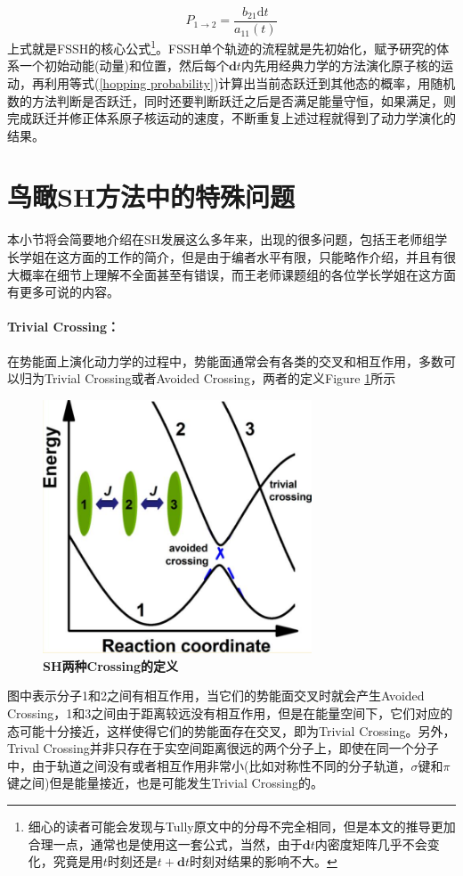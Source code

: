 \documentclass[12pt,a4paper,openany,twoside]{book}
\numberwithin{equation}{section}
\begin{document}
        \begin{equation}
          P_{1\rightarrow2}=\frac{b_{21} \mathrm{d}t }{ a_{11}(t)}
          \label{hopping probability}
        \end{equation}
        上式就是FSSH的核心公式\footnote{细心的读者可能会发现与Tully原文中的分母不完全相同，但是本文的推导更加合理一点，通常也是使用这一套公式，当然，由于$\mathbf{d}t$内密度矩阵几乎不会变化，究竟是用$t$时刻还是$t+\mathbf{d}t$时刻对结果的影响不大。}。FSSH单个轨迹的流程就是先初始化，赋予研究的体系一个初始动能(动量)和位置，然后每个$\mathbf{d}t$内先用经典力学的方法演化原子核的运动，再利用等式(\ref{hopping probability})计算出当前态跃迁到其他态的概率，用随机数的方法判断是否跃迁，同时还要判断跃迁之后是否满足能量守恒，如果满足，则完成跃迁并修正体系原子核运动的速度，不断重复上述过程就得到了动力学演化的结果。
        
      \section{鸟瞰SH方法中的特殊问题}
        本小节将会简要地介绍在SH发展这么多年来，出现的很多问题，包括王老师组学长学姐在这方面的工作的简介，但是由于编者水平有限，只能略作介绍，并且有很大概率在细节上理解不全面甚至有错误，而王老师课题组的各位学长学姐在这方面有更多可说的内容。

        \paragraph{Trivial Crossing：}在势能面上演化动力学的过程中，势能面通常会有各类的交叉和相互作用，多数可以归为Trivial Crossing或者Avoided Crossing，两者的定义Figure \ref{two kinds of crossing}所示
        \begin{figure}
          \centering
          \includegraphics[width = 8cm]{fig/crossing.jpg}
          \caption{\textbf{SH两种Crossing的定义}}
          \label{two kinds of crossing}
        \end{figure}
        图中表示分子1和2之间有相互作用，当它们的势能面交叉时就会产生Avoided Crossing，1和3之间由于距离较远没有相互作用，但是在能量空间下，它们对应的态可能十分接近，这样使得它们的势能面存在交叉，即为Trivial Crossing。另外，Trival Crossing并非只存在于实空间距离很远的两个分子上，即使在同一个分子中，由于轨道之间没有或者相互作用非常小(比如对称性不同的分子轨道，$\sigma$键和$\pi$键之间)但是能量接近，也是可能发生Trivial Crossing的。
\end{document}
